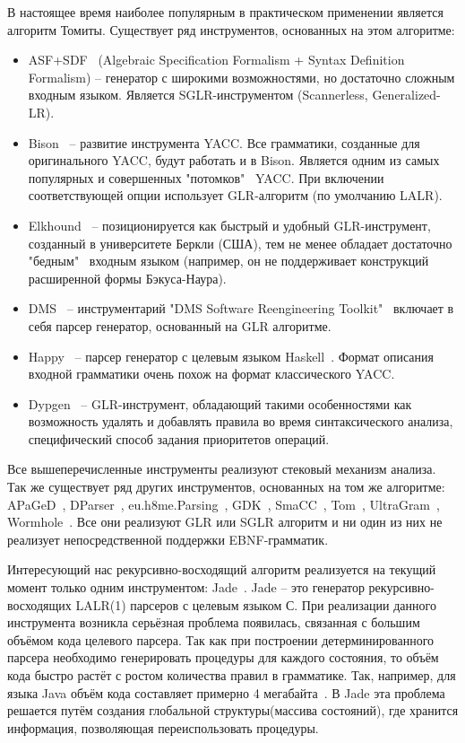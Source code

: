 В настоящее время наиболее популярным в практическом применении является алгоритм Томиты. Существует ряд инструментов, основанных на этом алгоритме:
\begin{itemize}
	\item
	 ASF+SDF~\cite{ASF+SDF} (Algebraic Specification Formalism + Syntax Definition Formalism) -- генератор с широкими возможностями, но достаточно сложным входным языком. Является SGLR-инструментом (Scannerless, Generalized-LR).
	
	\item
	 Bison~\cite{Bison} -- развитие инструмента YACC. Все грамматики, созданные 	для оригинального YACC, будут работать и в Bison. Является одним 	из самых популярных и совершенных "потомков" \ YACC. При включении 	соответствующей опции использует GLR-алгоритм (по умолчанию LALR).
	
	\item
	Elkhound~\cite{Elkhound} -- позиционируется как быстрый и удобный GLR-инструмент, созданный в университете Беркли (США), тем не менее обладает достаточно 	"бедным" \ входным языком (например, он не поддерживает конструкций 	расширенной формы Бэкуса-Наура).

  \item 
  DMS~\cite{DMS} -- инструментарий "DMS Software Reengineering Toolkit" \ включает в себя парсер генератор, основанный на GLR алгоритме.

	\item
  Happy~\cite{Happy} -- парсер генератор с целевым языком Haskell~\cite{Haskell}. Формат описания входной грамматики очень похож на формат классического YACC.

	\item
  Dypgen~\cite{Dypgen} -- GLR-инструмент, обладающий такими особенностями как возможность удалять и добавлять правила во время синтаксического анализа, специфический способ задания приоритетов операций.

\end{itemize}

Все вышеперечисленные инструменты реализуют стековый механизм анализа. Так же существует ряд других инструментов, основанных на том же алгоритме: 
APaGeD~\cite{APaGeD}, 
DParser~\cite{DParser}, 
eu.h8me.Parsing~\cite{h8me}, 
GDK~\cite{GDK}, 
SmaCC~\cite{SmaCC}, 
Tom~\cite{Tom}, 
UltraGram~\cite{UltraGram}, 
Wormhole~\cite{Wormhole}. Все они реализуют GLR или SGLR алгоритм и ни один из них не реализует непосредственной поддержки EBNF-грамматик.

Интересующий нас рекурсивно-восходящий алгоритм реализуется на текущий момент только одним инструментом: Jade~\cite{Jade}. Jade -- это генератор рекурсивно-восходящих LALR(1) парсеров с целевым языком С. При реализации данного инструмента возникла серьёзная проблема появилась, связанная с большим объёмом кода целевого парсера. Так как при построении детерминированного парсера необходимо генерировать процедуры для каждого состояния, то объём кода быстро растёт с ростом количества правил в грамматике. Так, например, для языка Java объём кода составляет примерно 4 мегабайта~\cite{Jade}. В Jade  эта проблема решается путём создания глобальной структуры(массива состояний), где хранится информация, позволяющая переиспользовать процедуры.

